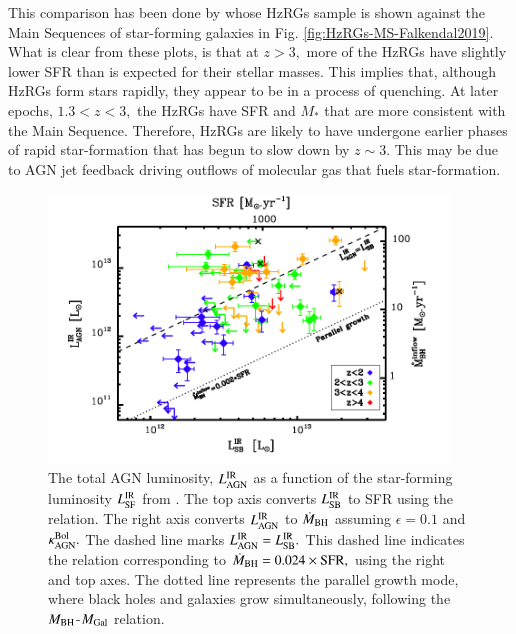This comparison has been done by \citet{falkendal2019} whose HzRGs sample is shown against the Main Sequences of star-forming galaxies in Fig. \ref{fig:HzRGs-MS-Falkendal2019}. What is clear from these plots, is that at $z > 3,$ more of the HzRGs have slightly lower SFR than is expected for their stellar masses. This implies that, although HzRGs form stars rapidly, they appear to be in a process of quenching. At later epochs, $ 1.3 < z < 3,$ the HzRGs have SFR and $M_*$ that are more consistent with the Main Sequence. Therefore, HzRGs are likely to have undergone earlier phases of rapid star-formation that has begun to slow down by $z\sim3.$ This may be due to AGN jet feedback driving outflows of molecular gas that fuels star-formation.

\begin{figure}[!ht]
    \centering
    \includegraphics[width=0.95\textwidth]{plots_chp1/SFR_AGN_LIR_Drouart_2014.png}
     \caption[AGN vs SF luminosity from \citet{Drouart2014}]{The total AGN luminosity, $L^{\rm IR}_{\rm AGN}$ as a function of the star-forming luminosity $L^{\rm IR}_{\rm SF}$ from \citet{Drouart2014}. The top axis converts $L^{\rm IR}_{\rm SB}$ to SFR using the \citet{Kennicutt1998} relation. The right axis converts $L^{\rm IR}_{\rm AGN}$ to $\dot{M}_{\rm BH}$ assuming $\epsilon=0.1$ and $\kappa^{\rm Bol}_{\rm AGN}.$ The dashed line marks $L^{\rm IR}_{\rm AGN} = L^{\rm IR}_{\rm SB}.$ This dashed line indicates the relation corresponding to $\dot{M}_{\rm BH} = 0.024 \times \rm SFR,$ using the right and top axes. The dotted line represents the parallel growth mode, where black holes and galaxies grow simultaneously, following the $M_{\rm BH}$-$M_{\rm Gal}$ relation.}
     \label{fig:SFR_AGN_LIR-Drouart}
\end{figure}     
    
